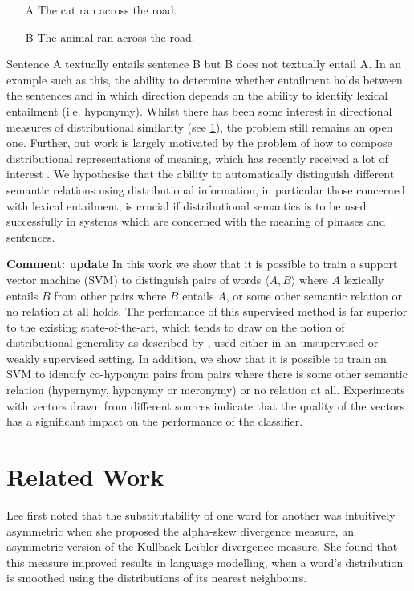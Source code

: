 \documentclass[11pt]{article}
\begin{document}
\begin{itemize}
\item[A]{The cat ran across the road.}
\item[B]{The animal ran across the road.}
\end{itemize}

Sentence A textually entails sentence B but B does not textually entail A. In an example such as this, the ability to determine whether entailment holds between the sentences and in which direction depends on the ability to identify lexical entailment (i.e. hyponymy). Whilst there has been some interest in directional measures of distributional similarity (see \ref{sect:relwork}), the problem still remains an open one.  Further, out work is largely motivated by the problem of how to compose distributional representations of meaning, which has recently received a lot of interest \cite{Widdows:08,Mitchell:08,Baroni2010,Grefenstette:11,Socher:12}.  We hypothesise that the ability to automatically distinguish different semantic relations using distributional information, in particular those concerned with lexical entailment, is crucial if distributional semantics is to be used successfully in systems which are concerned with the meaning of phrases and sentences.

{\bf Comment: update} In this work we show that it is possible to train a support vector machine (SVM) to distinguish pairs of words $\langle A,B\rangle$ where $A$ lexically entails $B$ from other pairs where $B$ entails $A$, or some other semantic relation or no relation at all holds.  The perfomance of this supervised method is far superior to the existing state-of-the-art, which tends to draw on the notion of distributional generality as described by \cite{Weeds2004}, used either in an unsupervised or weakly supervised setting.  In addition, we show that it is possible to train an SVM to identify co-hyponym pairs from pairs where there is some other semantic relation (hypernymy, hyponymy or meronymy) or no relation at all. Experiments with vectors drawn from different sources indicate that the quality of the vectors has a significant impact on the performance of the classifier.

\section{Related Work}
\label{sect:relwork}

Lee  first noted that the substitutability of one word for another was intuitively asymmetric when she proposed the alpha-skew divergence measure, an asymmetric version of the Kullback-Leibler divergence measure.  She found that this measure improved results in language modelling, when a word's distribution is smoothed using the distributions of its nearest neighbours.
\end{document}
